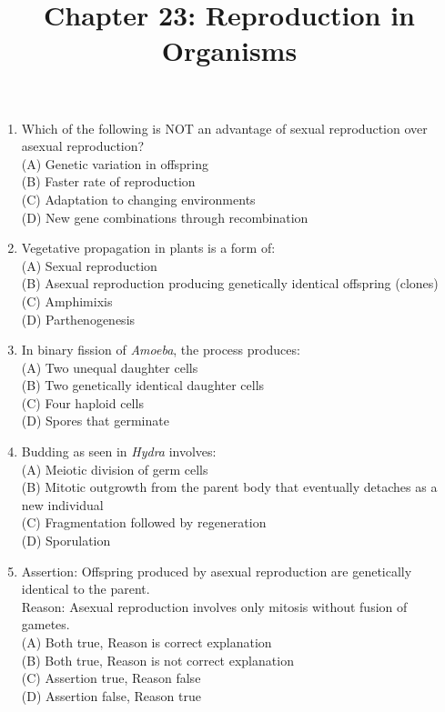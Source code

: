 \documentclass{article}
\begin{document}
\title{Chapter 23: Reproduction in Organisms}
\date{}
\maketitle

\begin{enumerate}[label=Q\arabic*.]

\item Which of the following is NOT an advantage of sexual reproduction over asexual reproduction?
\\(A) Genetic variation in offspring
\\(B) Faster rate of reproduction
\\(C) Adaptation to changing environments
\\(D) New gene combinations through recombination

\item Vegetative propagation in plants is a form of:
\\(A) Sexual reproduction
\\(B) Asexual reproduction producing genetically identical offspring (clones)
\\(C) Amphimixis
\\(D) Parthenogenesis

\item In binary fission of \textit{Amoeba}, the process produces:
\\(A) Two unequal daughter cells
\\(B) Two genetically identical daughter cells
\\(C) Four haploid cells
\\(D) Spores that germinate

\item Budding as seen in \textit{Hydra} involves:
\\(A) Meiotic division of germ cells
\\(B) Mitotic outgrowth from the parent body that eventually detaches as a new individual
\\(C) Fragmentation followed by regeneration
\\(D) Sporulation

\item Assertion: Offspring produced by asexual reproduction are genetically identical to the parent.\\
Reason: Asexual reproduction involves only mitosis without fusion of gametes.
\\(A) Both true, Reason is correct explanation
\\(B) Both true, Reason is not correct explanation
\\(C) Assertion true, Reason false
\\(D) Assertion false, Reason true


\end{enumerate}
\end{document}
